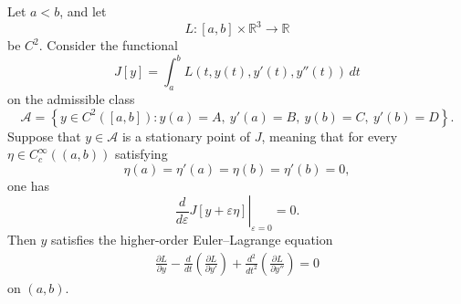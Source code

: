 ﻿\documentclass[12pt]{article}
\begin{document}
\begin{theorem}
Let $a < b$, and let
\[
 L:[a, b] \times \mathbb{R}^3 \to \mathbb{R}
\]
be $C^2$. Consider the functional
\[
 J[y] = \int_a^b L(t, y(t), y'(t), y''(t))\, dt
\]
on the admissible class
\[
 \mathcal A = \left\{ y \in C^2([a, b]): y(a) = A,\ y'(a) = B,\ y(b) = C,\ y'(b) = D \right\}.
\]
Suppose that $y \in \mathcal A$ is a stationary point of $J$, meaning that for every
$\eta \in C_c^\infty((a, b))$ satisfying
\begin{equation}\label{testfunction}
\eta(a) = \eta'(a) = \eta(b) = \eta'(b) = 0,
\end{equation}
one has
\[
 \left.\frac{d}{d\varepsilon}J[y + \varepsilon\eta]\right|_{\varepsilon = 0} = 0.
\]
Then $y$ satisfies the higher-order Euler--Lagrange equation
\[
\boxed{
\begin{aligned}
\frac{\partial L}{\partial y}
-
\frac{d}{dt}\left(\frac{\partial L}{\partial y'}\right)
+
\frac{d^2}{dt^2}\left(\frac{\partial L}{\partial y''}\right)
 = 0
\end{aligned}
}
\]
on $(a, b)$.
\end{theorem} 
\end{document}
